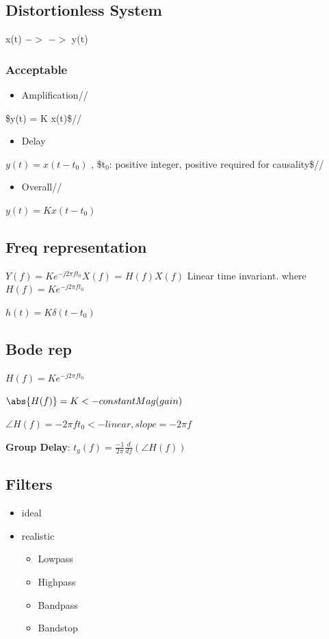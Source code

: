 \documentclass[11pt]{article}
\begin{document}
\subsection{Distortionless System}
\label{sec-6-1}

x(t) $->$ \box $->$ y(t)

\subsubsection{Acceptable}
\label{sec-6-1-1}
\begin{itemize}
\item Amplification//
\end{itemize}
\$y(t) = K x(t)\$//

\begin{itemize}
\item Delay \\
\end{itemize}
$y(t) = x(t-t_0)$ , \$t$_{\text{0}}$: positive integer, positive required for causality\$//

\begin{itemize}
\item Overall//
\end{itemize}
$y(t) = K x(t-t_0)$

\subsection{Freq representation}
\label{sec-6-2}

$Y(f)  = K e^{-j2\pi ft_0} X(f)$
  = $H(f)X(f)$ Linear time invariant.
where $H(f) = Ke^{-j2\pi ft_0}$

$h(t) = K\delta(t-t_0)$

\subsection{Bode rep}
\label{sec-6-3}
$H(f) = Ke^{-j2\pi ft_0}$

$\abs{H(f)} = K <- constant Mag(gain)$

$\angle{H(f)} = -2\pi ft_0 <- linear, slope = -2\pi f$


\textbf{Group Delay}: $t_g(f) = \frac{-1}{2\pi} \frac{d}{df}(\angle{H(f)})$

\subsection{Filters}
\label{sec-6-4}
\begin{itemize}
\item ideal\\
\item realistic
\begin{itemize}
\item Lowpass
\item Highpass
\item Bandpass
\item Bandstop
\end{itemize}
\end{itemize}
\end{document}
